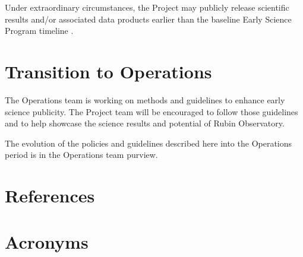 \documentclass[SE,authoryear,toc]{lsstdoc}
\begin{document}
Under extraordinary circumstances, the Project may publicly release scientific results and/or associated data products earlier than the baseline Early Science Program timeline .

\section{Transition to Operations}
\label{operations}

The Operations team is working on methods and guidelines to enhance early science publicity.
The Project team will be encouraged to follow those guidelines and to help showcase the science results and potential of Rubin Observatory.

The evolution of the policies and guidelines described here into the Operations period is in the Operations team purview.


\appendix
\section{References} \label{sec:bib}
\renewcommand{\refname}{} %


\section{Acronyms} \label{sec:acronyms}

\end{document}
